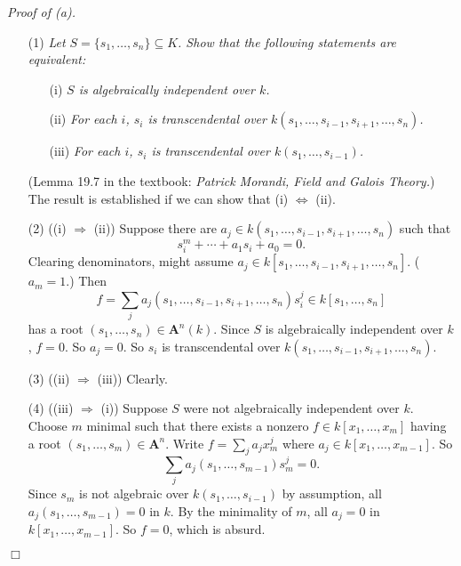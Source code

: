 \documentclass{article}
\begin{document}
\emph{Proof of (a).}
\begin{enumerate}
\item[(1)]
  \emph{Let $S = \{ s_1,\ldots,s_n \} \subseteq K$.
  Show that the following statements are equivalent:}
  \begin{enumerate}
  \item[(i)]
    \emph{$S$ is algebraically independent over $k$.}

  \item[(ii)]
    \emph{For each $i$, $s_i$ is transcendental over $k(s_1,\ldots,s_{i-1},s_{i+1},\ldots,s_n)$.}

  \item[(iii)]
    \emph{For each $i$, $s_i$ is transcendental over $k(s_1,\ldots,s_{i-1})$.}
  \end{enumerate}
  (Lemma 19.7 in the textbook: \emph{Patrick Morandi, Field and Galois Theory.})
  The result is established if we can show that (i) $\Longleftrightarrow$ (ii).

\item[(2)]
  ((i) $\Longrightarrow$ (ii))
  Suppose there are $a_j \in k(s_1,\ldots,s_{i-1},s_{i+1},\ldots,s_n)$ such that
  \[
    s_i^{m} + \cdots + a_1 s_i + a_0 = 0.
  \]
  Clearing denominators, might assume $a_j \in k[s_1,\ldots,s_{i-1},s_{i+1},\ldots,s_n]$.
  ($a_m = 1$.)
  Then
  \[
    f
    = \sum_j a_j(s_1,\ldots,s_{i-1},s_{i+1},\ldots,s_n)s_i^j
    \in k[s_1,\ldots,s_n]
  \]
  has a root $(s_1,\ldots,s_n) \in \mathbf{A}^{n}(k)$.
  Since $S$ is algebraically independent over $k$, $f = 0$.
  So $a_j = 0$.
  So $s_i$ is transcendental over $k(s_1,\ldots,s_{i-1},s_{i+1},\ldots,s_n)$.

\item[(3)]
  ((ii) $\Longrightarrow$ (iii))
  Clearly.

\item[(4)]
  ((iii) $\Longrightarrow$ (i))
  Suppose $S$ were not algebraically independent over $k$.
  Choose $m$ minimal such that there exists a nonzero
  $f \in k[x_1,\ldots,x_m]$ having a root $(s_1,\ldots,s_m) \in \mathbf{A}^{n}$.
  Write $f = \sum_j a_j x_m^j$ where $a_j \in k[x_1,\ldots,x_{m-1}]$.
  So
  \[
    \sum_j a_j(s_1,\ldots,s_{m-1}) s_m^j = 0.
  \]
  Since $s_m$ is not algebraic over $k(s_1,\ldots,s_{i-1})$ by assumption,
  all $a_j(s_1,\ldots,s_{m-1}) = 0$ in $k$.
  By the minimality of $m$, all $a_j = 0$ in $k[x_1,\ldots,x_{m-1}]$.
  So $f = 0$, which is absurd.
\end{enumerate}
$\Box$ \\
\end{document}
